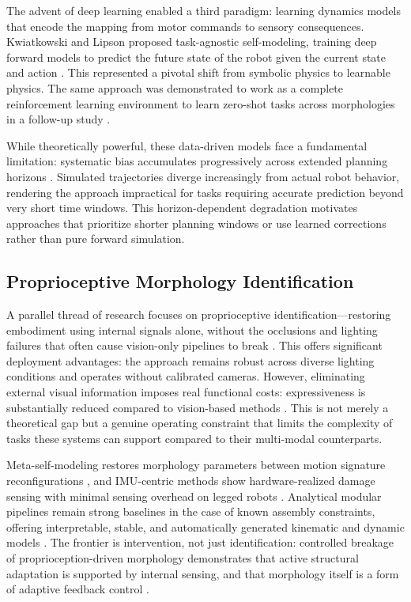 \documentclass[12pt,a4paper,oneside]{report}
\begin{document}
The advent of deep learning enabled a third paradigm: learning dynamics models that encode the mapping from motor commands to sensory consequences. Kwiatkowski and Lipson proposed task-agnostic self-modeling, training deep forward models to predict the future state of the robot given the current state and action \cite{kwiatkowski2019task}. This represented a pivotal shift from symbolic physics to learnable physics. The same approach was demonstrated to work as a complete reinforcement learning environment to learn zero-shot tasks across morphologies in a follow-up study \cite{kwiatkowski2019zeroshot}.

While theoretically powerful, these data-driven models face a fundamental limitation: systematic bias accumulates progressively across extended planning horizons \cite{kwiatkowski2019task}. Simulated trajectories diverge increasingly from actual robot behavior, rendering the approach impractical for tasks requiring accurate prediction beyond very short time windows. This horizon-dependent degradation motivates approaches that prioritize shorter planning windows or use learned corrections rather than pure forward simulation.

\subsection{Proprioceptive Morphology Identification}

A parallel thread of research focuses on proprioceptive identification—restoring embodiment using internal signals alone, without the occlusions and lighting failures that often cause vision-only pipelines to break \cite{hu2024reconfigurable}. This offers significant deployment advantages: the approach remains robust across diverse lighting conditions and operates without calibrated cameras. However, eliminating external visual information imposes real functional costs: expressiveness is substantially reduced compared to vision-based methods \cite{farghdani2025robust}. This is not merely a theoretical gap but a genuine operating constraint that limits the complexity of tasks these systems can support compared to their multi-modal counterparts.

Meta-self-modeling restores morphology parameters between motion signature reconfigurations \cite{hu2024reconfigurable}, and IMU-centric methods show hardware-realized damage sensing with minimal sensing overhead on legged robots \cite{farghdani2025robust}. Analytical modular pipelines remain strong baselines in the case of known assembly constraints, offering interpretable, stable, and automatically generated kinematic and dynamic models \cite{dogra2022unified}. The frontier is intervention, not just identification: controlled breakage of proprioception-driven morphology demonstrates that active structural adaptation is supported by internal sensing, and that morphology itself is a form of adaptive feedback control \cite{xu2026antenna, yu2026kinematicself}.
\end{document}

